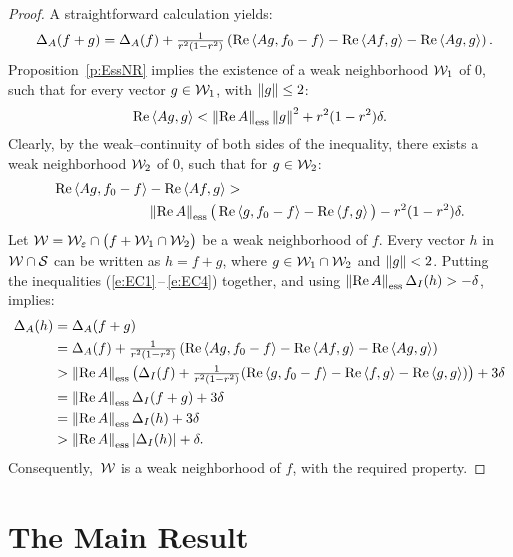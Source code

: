 \begin{proof}
A straightforward calculation yields:
\begin{equation}\label{e:EC2} ~
  ~\Delta_A(f+g) = \Delta_A(f) + \tfrac{1}{r^2(1-r^2)}\left(
   \operatorname{Re}\left<A g,f_0-f\right> - \operatorname{Re}\left<A f,g\right> - \operatorname{Re}\left<A g,g\right> \right).
\end{equation}
Proposition~\ref{p:EssNR} implies the existence of a weak
neighborhood ${\cal W}_1$ of $0$, such that for every vector
$g\in{\cal W}_1$, with $\left\Vert g\right\Vert\leq2$:
\begin{equation}\label{e:EC3}
  \RE\seq{A g,g} < \essnorm{\RE{}A} \norm{g}^2 + r^2(1-r^2)\delta.
\end{equation}
Clearly, by the weak--continuity of both sides of the
inequality, there exists a weak neighborhood ${\cal W}_2$ of $0$,
such that for $g\in{\cal W}_2$:
\begin{equation}\label{e:EC4}
\begin{split}
  \RE\seq{A g,f_0-f} & - \RE\seq{A f,g} > \\
   & \essnorm{\RE{}A}\big(\RE\seq{g,f_0-f}-\RE\seq{f,g}\big)
     -r^2(1-r^2)\delta.
\end{split}
\end{equation}
Let ${\cal W} = {\cal W}_\varepsilon\cap\big(f + {\cal W}_1\cap{\cal W}_2\big)$ be a weak
neighborhood of $f$. Every vector $h$ in ${\cal W}\cap{\cal S}$ can be
written as $h=f+g$, where $g \in {\cal W}_1\cap{\cal W}_2$ and
$\left\Vert g\right\Vert<2$. Putting the inequalities
(\ref{e:EC1}\,--\,\ref{e:EC4}) together, and using
$\essnorm{\RE{}A} \Delta_I(h) > -\delta$, implies:
\begin{equation*}
\begin{split}
 \Delta_A(h) &= \Delta_A(f+g)\\
 &= \Delta_A(f) + \tfrac{1}{r^2(1-r^2)}\left(
      \RE\seq{A g,f_0-f} - \RE\seq{A f,g} - \RE\seq{A g,g}\right)\\
 &> \essnorm{\RE{}A}\big( \Delta_I(f) + \tfrac{1}{r^2(1-r^2)}(
      \RE\seq{g,f_0-f} - \RE\seq{f,g} - \RE\seq{g,g})\big) + 3\delta\\
 &= \essnorm{\RE{}A} \Delta_I(f+g) + 3\delta\\
 &= \essnorm{\RE{}A} \Delta_I(h) + 3\delta\\
 &> \essnorm{\RE{}A} \abs{\Delta_I(h)} + \delta.
\end{split}
\end{equation*}
Consequently,\, ${\cal W}$ is a weak neighborhood of $f$, with the
required property.
\end{proof}

\goodbreak
\section{The Main Result}

